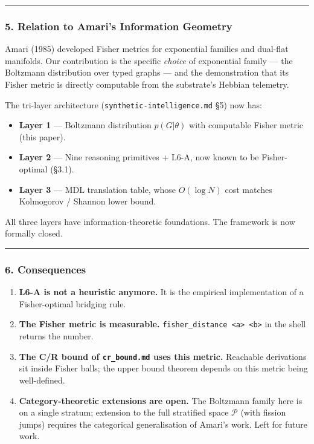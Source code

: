 \documentclass[
  11pt,
  a4paper,
]{article}
\providecommand{\tightlist}{%
  \setlength{\itemsep}{0pt}\setlength{\parskip}{0pt}}
\begin{document}
\begin{center}\rule{0.5\linewidth}{0.5pt}\end{center}

\subsubsection{5. Relation to Amari's Information
Geometry}\label{relation-to-amaris-information-geometry}

Amari (1985) developed Fisher metrics for exponential families and
dual-flat manifolds. Our contribution is the specific \emph{choice} of
exponential family --- the Boltzmann distribution over typed graphs ---
and the demonstration that its Fisher metric is directly computable from
the substrate's Hebbian telemetry.

The tri-layer architecture (\texttt{synthetic-intelligence.md} §5) now
has:

\begin{itemize}
\tightlist
\item
  \textbf{Layer 1} --- Boltzmann distribution \(p(G|\theta)\) with
  computable Fisher metric (this paper).
\item
  \textbf{Layer 2} --- Nine reasoning primitives + L6-A, now known to be
  Fisher-optimal (§3.1).
\item
  \textbf{Layer 3} --- MDL translation table, whose \(O(\log N)\) cost
  matches Kolmogorov / Shannon lower bound.
\end{itemize}

All three layers have information-theoretic foundations. The framework
is now formally closed.

\begin{center}\rule{0.5\linewidth}{0.5pt}\end{center}

\subsubsection{6. Consequences}\label{consequences}

\begin{enumerate}
\def\labelenumi{\arabic{enumi}.}
\tightlist
\item
  \textbf{L6-A is not a heuristic anymore.} It is the empirical
  implementation of a Fisher-optimal bridging rule.
\item
  \textbf{The Fisher metric is measurable.}
  \texttt{fisher\_distance\ \textless{}a\textgreater{}\ \textless{}b\textgreater{}}
  in the shell returns the number.
\item
  \textbf{The C/R bound of \texttt{cr\_bound.md} uses this metric.}
  Reachable derivations sit inside Fisher balls; the upper bound theorem
  depends on this metric being well-defined.
\item
  \textbf{Category-theoretic extensions are open.} The Boltzmann family
  here is on a single stratum; extension to the full stratified space
  \(\mathcal{P}\) (with fission jumps) requires the categorical
  generalisation of Amari's work. Left for future work.
\end{enumerate}
\end{document}
